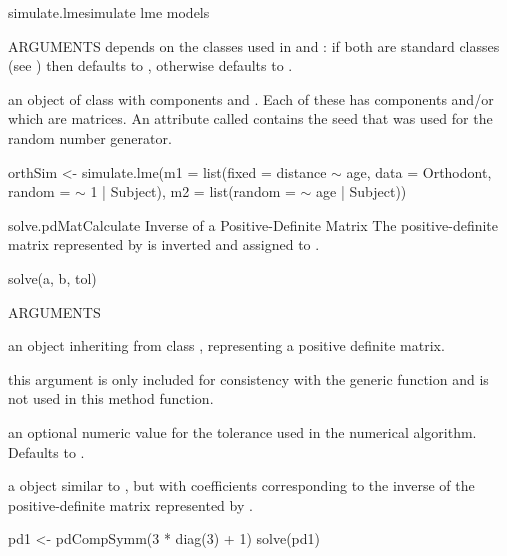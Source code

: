 \documentclass[pdftex]{article} \usepackage{url,graphicx}
\renewcommand{\Twiddle}{\mbox{\(\sim\)}}
\begin{document}
\begin{Helpfile}{simulate.lme}{simulate lme models}
\begin{Argument}{ARGUMENTS}
depends on the  classes used in  and :
if both are standard classes (see ) then
defaults to , otherwise defaults to .
\end{Argument}
an object of class  with components  and
.  Each of these has components  and/or 
which are matrices.  An attribute called  contains
the seed that was used for the random number generator.
\need 15pt
\vspace{-16pt} 
\begin{Example}
orthSim <-
 simulate.lme(m1 = list(fixed = distance {\Twiddle} age, data = Orthodont,
                        random = {\Twiddle} 1 | Subject),
              m2 = list(random = {\Twiddle} age | Subject))
\end{Example}
\end{Helpfile}
\begin{Helpfile}{solve.pdMat}{Calculate Inverse of a Positive-Definite Matrix}
The positive-definite matrix represented by  is inverted and
assigned to .
\begin{Example}
solve(a, b, tol)
\end{Example}
\begin{Argument}{ARGUMENTS}
\item[\Co{a:}]
an object inheriting from class , representing
a positive definite matrix.
\item[\Co{b:}]
this argument is only included for consistency with the generic
function and is not used in this method function.
\item[\Co{tol:}]
an optional numeric value for the tolerance used in the
numerical algorithm. Defaults to .
\end{Argument}
a  object similar to , but with coefficients
corresponding to the inverse of the positive-definite matrix
represented by .
\need 15pt
\vspace{-16pt} 
\begin{Example}
pd1 <- pdCompSymm(3 * diag(3) + 1)
solve(pd1)
\end{Example}
\end{Helpfile}
\end{document}
